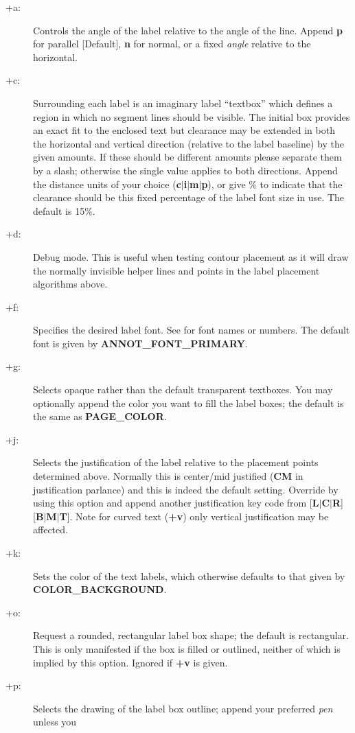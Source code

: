 \begin{description}
\item [+a:]  Controls the angle of the label relative to the angle of the line.  Append {\bf p}
for parallel [Default], {\bf n} for normal, or a fixed {\it angle} relative to the
horizontal.
\item [+c:] Surrounding each label is an imaginary label ``textbox'' which defines a region in
which no segment lines should be visible.  The initial box provides an exact fit to the enclosed
text but clearance may be extended in both the horizontal and vertical direction (relative to the label
baseline) by the given amounts.  If these should be different amounts please separate them by
a slash; otherwise the single value applies to both directions.  Append the distance units of
your choice ({\bf c$|$i$|$m$|$p}), or give \% to indicate that the clearance should be this
fixed percentage of the label font size in use.  The default is 15\%.
\item [+d:] Debug mode.  This is useful when testing contour placement as it will draw the normally
invisible helper lines and points in the label placement algorithms above.
\item [+f:] Specifies the desired label font.  See  for font names or numbers.  The
default font is given by {\bf ANNOT\_FONT\_PRIMARY}.
\item [+g:] Selects opaque rather than the default transparent textboxes.  You may optionally append
the color you want to fill the label boxes; the default is the same as {\bf PAGE\_COLOR}.
\item [+j:] Selects the justification of the label relative to the placement points determined
above.  Normally this is center/mid justified ({\bf CM} in  justification parlance) and
this is indeed the default setting.  Override by using this option and append another justification
key code from [{\bf L$|$C$|$R}][{\bf B$|$M$|$T}].  Note for curved text ({\bf +v}) only vertical
justification may be affected.
\item [+k:] Sets the color of the text labels, which otherwise defaults to that given by {\bf COLOR\_BACKGROUND}.
\item [+o:] Request a rounded, rectangular label box shape; the default is rectangular.  This is only
manifested if the box is filled or outlined, neither of which is implied by this option.  Ignored if {\bf +v}
is given.
\item [+p:] Selects the drawing of the label box outline; append your preferred {\it pen} unless you

\end{description}
